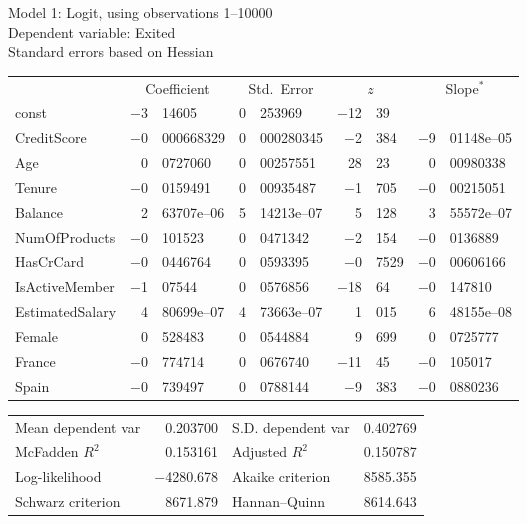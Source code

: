 \documentclass[11pt]{article}
\begin{document}
\thispagestyle{empty}

\begin{center}

Model 1: Logit, using observations 1--10000\\
Dependent variable: Exited\\
Standard errors based on Hessian

\vspace{1em}

\begin{tabular}{lr@{.}lr@{.}lr@{.}lr@{.}l}
  &
 \multicolumn{2}{c}{Coefficient} &
  \multicolumn{2}{c}{Std.\ Error} &
   \multicolumn{2}{c}{$z$} &
    \multicolumn{2}{c}{Slope$^*$} \\[1ex]
const &
  $-$3&14605 &
    0&253969 &
      $-$12&39 &
        \multicolumn{2}{c}{} \\
CreditScore &
  $-$0&000668329 &
    0&000280345 &
      $-$2&384 &
        $-$9&01148\textrm{e--05} \\
Age &
  0&0727060 &
    0&00257551 &
      28&23 &
        0&00980338 \\
Tenure &
  $-$0&0159491 &
    0&00935487 &
      $-$1&705 &
        $-$0&00215051 \\
Balance &
  2&63707\textrm{e--06} &
    5&14213\textrm{e--07} &
      5&128 &
        3&55572\textrm{e--07} \\
NumOfProducts &
  $-$0&101523 &
    0&0471342 &
      $-$2&154 &
        $-$0&0136889 \\
HasCrCard &
  $-$0&0446764 &
    0&0593395 &
      $-$0&7529 &
        $-$0&00606166 \\
IsActiveMember &
  $-$1&07544 &
    0&0576856 &
      $-$18&64 &
        $-$0&147810 \\
EstimatedSalary &
  4&80699\textrm{e--07} &
    4&73663\textrm{e--07} &
      1&015 &
        6&48155\textrm{e--08} \\
Female &
  0&528483 &
    0&0544884 &
      9&699 &
        0&0725777 \\
France &
  $-$0&774714 &
    0&0676740 &
      $-$11&45 &
        $-$0&105017 \\
Spain &
  $-$0&739497 &
    0&0788144 &
      $-$9&383 &
        $-$0&0880236 \\
\end{tabular}

\vspace{1ex}
\begin{tabular}{lrlr}
Mean dependent var &  0.203700 & S.D. dependent var &  0.402769 \\
McFadden $R^2$ &  0.153161 & Adjusted $R^2$ &  0.150787 \\
Log-likelihood & $-$4280.678 & Akaike criterion &  8585.355 \\
Schwarz criterion &  8671.879 & Hannan--Quinn &  8614.643 \\
\end{tabular}



\end{center}
\end{document}
